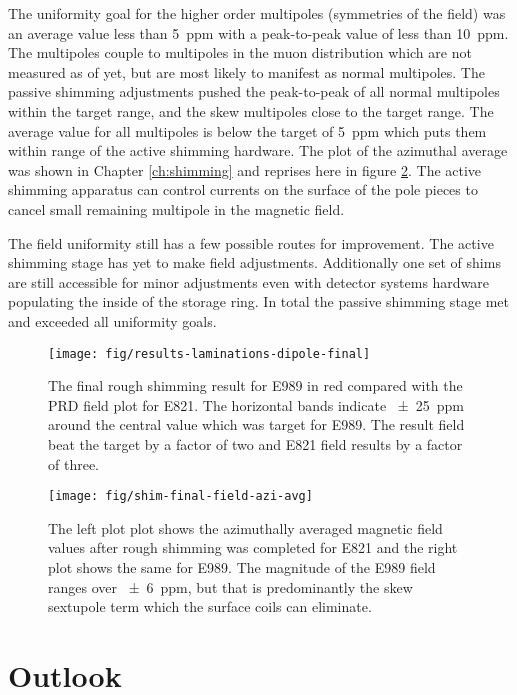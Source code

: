 The uniformity goal for the higher order multipoles (symmetries of the field) was an average value less than \SI{5}{ppm} with a peak-to-peak value of less than \SI{10}{ppm}.  The multipoles couple to multipoles in the muon distribution which are not measured as of yet, but are most likely to manifest as normal multipoles.  The passive shimming adjustments pushed the peak-to-peak of all normal multipoles within the target range, and the skew multipoles close to the target range.  The average value for all multipoles is below the target of \SI{5}{ppm} which puts them within range of the active shimming hardware.  The plot of the azimuthal average was shown in Chapter \ref{ch:shimming} and reprises here in figure \ref{fig:conclusion-azi-avg}.  The active shimming apparatus can control currents on the surface of the pole pieces to cancel small remaining multipole in the magnetic field.

The field uniformity still has a few possible routes for improvement.  The active shimming stage has yet to make field adjustments.  Additionally one set of shims are still accessible for minor adjustments even with \mugmtwo detector systems hardware populating the inside of the storage ring. In total the passive shimming stage met and exceeded all uniformity goals.

\begin{figure}
\centering
\texttt{[image: fig/results-laminations-dipole-final]}
\caption{The final rough shimming result for E989 in red compared with the PRD field plot for E821.  The horizontal bands indicate \SI{\pm 25}{ppm} around the central value which was target for E989.  The result field beat the target by a factor of two and E821 field results by a factor of three. \label{fig:conclusions-dipole-final}}
\end{figure}

\begin{figure}
\centering
\texttt{[image: fig/shim-final-field-azi-avg]}
\caption{
    The left plot plot shows the azimuthally averaged magnetic field values after rough shimming was completed for E821 and the right plot shows the same for E989.  The magnitude of the E989 field ranges over \SI{\pm 6}{ppm}, but that is predominantly the skew sextupole term which the surface coils can eliminate.
    \label{fig:conclusion-azi-avg}
}
\end{figure}

\section{Outlook}

